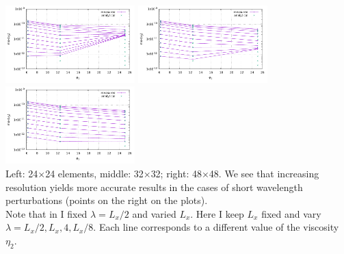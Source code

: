 \begin{center}
\includegraphics[width=5cm]{python_codes/fieldstone_40/images/plot24x24}
\includegraphics[width=5cm]{python_codes/fieldstone_40/images/plot32x32}
\includegraphics[width=5cm]{python_codes/fieldstone_40/images/plot48x48}\\
{\captionfont  Left: 24$\times$24 elements, middle: 32$\times$32; right: 48$\times$48. We see that 
increasing resolution yields more accurate results in the cases of short wavelength 
perturbations (points on the right on the plots).\\  
Note that in \cite{thie11} I fixed $\lambda=L_x/2$ and varied $L_x$. Here I keep $L_x$ fixed
and vary $\lambda=L_x/2,L_x,4,L_x/8$. Each line corresponds to a different value of the viscosity $\eta_2$.} 
\end{center}


